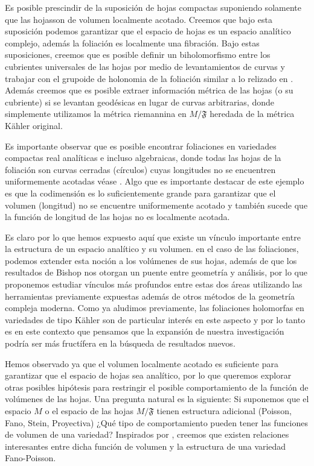 \documentclass[letterpaper]{report}
\begin{document}
Es posible prescindir de la suposici\'on de hojas compactas suponiendo solamente que las hojasson de volumen localmente acotado. 
Creemos que bajo esta suposici\'on podemos garantizar que el espacio de hojas es un espacio anal\'itico complejo, adem\'as la 
foliaci\'on es localmente una fibraci\'on. Bajo estas suposiciones, creemos que es posible definir 
un biholomorfismo entre los cubrientes universales de las hojas por medio de levantamientos de curvas y trabajar con el grupoide 
de holonomia de la foliaci\'on similar a lo relizado en \cite{DPPT}. Adem\'as creemos que es posible extraer informaci\'on m\'etrica 
de las hojas (o su cubriente) si se levantan geod\'esicas en lugar de curvas arbitrarias, donde  simplemente utilizamos la 
m\'etrica riemannina en $M/\mathfrak{F}$ heredada de la m\'etrica K\"ahler original. 

Es importante observar que es posible encontrar foliaciones en variedades compactas real anal\'iticas e incluso algebraicas, donde 
todas las hojas de la foliaci\'on son curvas cerradas (c\'irculos) cuyas longitudes no se encuentren uniformemente acotadas 
v\'ease \cite{E-V}. Algo que es importante destacar de este ejemplo es que la codimensi\'on es lo suficientemente grande 
para garantizar que el volumen (longitud) no se encuentre uniformemente acotado y tambi\'en sucede que la funci\'on de longitud de las hojas 
no es localmente acotada.

Es claro por lo que hemos expuesto aqu\'i que existe un v\'inculo importante entre la estructura de un espacio anal\'itico y su volumen.
en el caso de las foliaciones, podemos extender esta noci\'on a los vol\'umenes de sus hojas, adem\'as de que los resultados de Bishop 
nos otorgan un puente entre geometr\'ia y an\'alisis, por lo que proponemos  estudiar v\'inculos m\'as profundos entre estas
dos \'areas utilizando las herramientas previamente expuestas adem\'as de otros m\'etodos de la geometr\'ia compleja moderna.
Como ya aludimos previamente, las foliaciones holomorfas en variedades de tipo K\"ahler son de particular inter\'es en este aspecto
y por lo tanto es en este contexto que pensamos que la expansi\'on de nuestra investigaci\'on podr\'ia ser m\'as fruct\'ifera en la
b\'usqueda de resultados nuevos. 

Hemos observado ya que el volumen localmente acotado es suficiente para garantizar que el espacio de hojas sea anal\'itico, 
por lo que queremos explorar otras posibles hip\'otesis para restringir el posible comportamiento de la funci\'on de vol\'umenes
de las hojas. Una pregunta natural es la siguiente: Si suponemos que el espacio $M$ o el espacio de las hojas $M/\mathfrak{F}$ tienen 
estructura adicional (Poisson, Fano, Stein, Proyectiva) ¿Qu\'e tipo de comportamiento pueden tener las funciones de volumen de
una variedad? Inspirados por \cite{DPPT}, creemos que existen relaciones interesantes entre dicha funci\'on de volumen y la estructura 
de una variedad Fano-Poisson.
\end{document}
